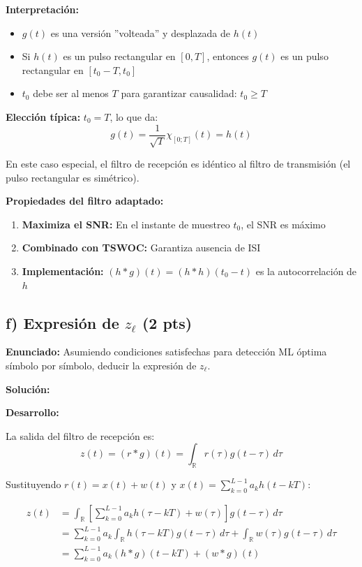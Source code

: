 \documentclass[11pt,a4paper]{article}
\begin{document}
\textbf{Interpretaci\'on:}

\begin{itemize}
    \item $g(t)$ es una versi\'on ''volteada'' y desplazada de $h(t)$
    \item Si $h(t)$ es un pulso rectangular en $[0, T]$, entonces $g(t)$ es un pulso rectangular en $[t_0-T, t_0]$
    \item $t_0$ debe ser al menos $T$ para garantizar causalidad: $t_0 \geq T$
\end{itemize}

\textbf{Elecci\'on t\'ipica:} $t_0 = T$, lo que da:
\[
g(t) = \frac{1}{\sqrt{T}} \chi_{[0;T]}(t) = h(t)
\]

En este caso especial, el filtro de recepci\'on es id\'entico al filtro de transmisi\'on (el pulso rectangular es sim\'etrico).

\textbf{Propiedades del filtro adaptado:}

\begin{enumerate}
    \item \textbf{Maximiza el SNR:} En el instante de muestreo $t_0$, el SNR es m\'aximo
    
    \item \textbf{Combinado con TSWOC:} Garantiza ausencia de ISI
    
    \item \textbf{Implementaci\'on:} $(h * g)(t) = (h * h)(t_0 - t)$ es la autocorrelaci\'on de $h$
\end{enumerate}



\subsection*{f) Expresi\'on de $z_\ell$ (2 pts)}

\textbf{Enunciado:} Asumiendo condiciones satisfechas para detecci\'on ML \'optima s\'imbolo por s\'imbolo, deducir la expresi\'on de $z_\ell$.

\vspace{0.3cm}
\textbf{Soluci\'on:}

\textbf{Desarrollo:}

La salida del filtro de recepci\'on es:
\[
z(t) = (r * g)(t) = \int_{\mathbb{R}} r(\tau) g(t - \tau)\, d\tau
\]

Sustituyendo $r(t) = x(t) + w(t)$ y $x(t) = \sum_{k=0}^{L-1} a_k h(t-kT)$:

\begin{align*}
z(t) &= \int_{\mathbb{R}} \left[\sum_{k=0}^{L-1} a_k h(\tau-kT) + w(\tau)\right] g(t-\tau)\, d\tau \\
&= \sum_{k=0}^{L-1} a_k \int_{\mathbb{R}} h(\tau-kT) g(t-\tau)\, d\tau + \int_{\mathbb{R}} w(\tau) g(t-\tau)\, d\tau \\
&= \sum_{k=0}^{L-1} a_k (h * g)(t-kT) + (w * g)(t)
\end{align*}
\end{document}
